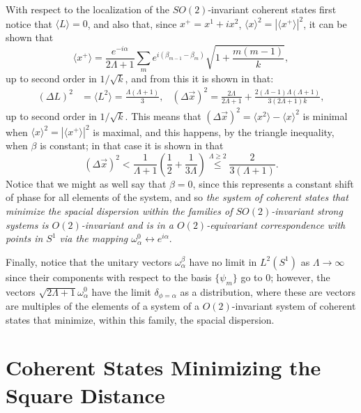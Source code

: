 With respect to the localization of the $SO(2)$-invariant coherent states first notice that $\langle L \rangle = 0$, and also that, since $x^+ = x^1 + i x^2$, $\langle x\rangle ^2 = |\langle x^+ \rangle|^2$, it can be shown that 
\begin{equation*}
    \langle x^+ \rangle = \frac{e^{-i\alpha}}{2\Lambda + 1} \sum_{m} e^{i( \beta_{m-1} - \beta_m)} \sqrt{1 + \frac{m(m-1)}{k}},
\end{equation*} 
up to second order in $1/\sqrt{k}$, and from this it is shown in \cite{FioreCoherent2020} that:
\begin{align}\label{equationLocalizationAllStrongSystemsCoherentD2}
    (\Delta L)^2 &= \langle L^2 \rangle = \frac{\Lambda(\Lambda + 1)}{3},&
    (\Delta \vec x)^2 = \frac{2 \Lambda}{2 \Lambda + 1} + \frac{2(\Lambda - 1)\Lambda (\Lambda + 1)}{3(2\Lambda + 1)k},
\end{align}
up to second order in $1/\sqrt{k}$. This means that $(\Delta \vec x)^2 = \langle x^2 \rangle - \langle x \rangle ^2$ is minimal when $\langle x \rangle ^2 = |\langle x^+ \rangle |^2$ is maximal, and this happens, by the triangle inequality, when $\beta$ is constant; in that case it is shown in \cite{FioreCoherent2020} that
\begin{equation}
    (\Delta \vec x)^2 < \frac{1}{\Lambda + 1} \left( \frac{1}{2} + \frac{1}{3\Lambda} \right) \overset{\Lambda \geq 2}{\leq } \frac{2}{3(\Lambda + 1)}.
\end{equation}
Notice that we might as well say that $\beta = 0$, since this represents a constant shift of phase for all elements of the system, and so \textit{the system of coherent states that minimize the spacial dispersion within the families of $SO(2)$-invariant strong systems is $O(2)$-invariant and is in a $O(2)$-equivariant correspondence with points in $S^1$ via the mapping $\omega^0_\alpha \leftrightarrow e^{i \alpha}$}.

Finally, notice that the unitary vectors $\omega^\beta_\alpha$ have no limit in $L^2(S^1)$ as $\Lambda \to \infty$ since their components with respect to the basis $\{\psi_m\}$ go to $0$; however, the vectors $\sqrt{2\Lambda + 1}\omega^0_\alpha$ have the limit $\delta_{\phi = \alpha}$ as a distribution, where these are vectors are multiples of the elements of a system of a $O(2)$-invariant system of coherent states that minimize, within this family, the spacial dispersion.

\section{Coherent States Minimizing the Square Distance}


